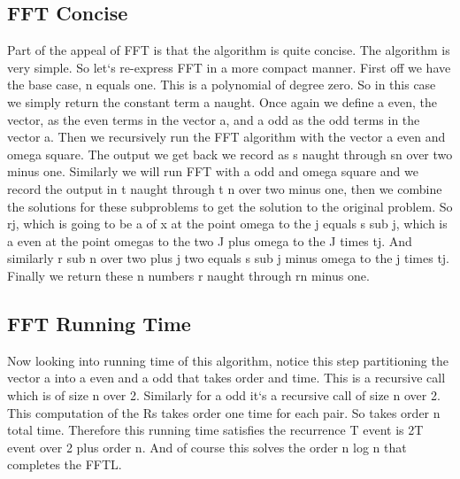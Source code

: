 \subsection{FFT  Concise}
Part of the appeal of FFT is that the algorithm is quite concise.
The algorithm is very simple.
So let`s re-express FFT in a more compact manner.
First off we have the base case, n equals one.
This is a polynomial of degree zero.
So in this case we simply return the constant term a naught.
Once again we define a even, the vector, as the even terms in the vector a, and a odd as the odd terms in the vector a.
Then we recursively run the FFT algorithm with the vector a even and omega square.
The output we get back we record as s naught through sn over two minus one.
Similarly we will run FFT with a odd and omega square and we record the output in t naught through t n over two minus one, then we combine the solutions for these subproblems to get the solution to the original problem.
So rj, which is going to be a of x at the point omega to the j equals s sub j, which is a even at the point omegas to the two J plus omega to the J times tj.
And similarly r sub n over two plus j two equals s sub j minus omega to the j times tj.
Finally we return these n numbers r naught through rn minus one.

\subsection{FFT  Running Time}
Now looking into running time of this algorithm, notice this step partitioning the vector a into a even and a odd that takes order and time.
This is a recursive call which is of size n over 2.
Similarly for a odd it`s a recursive call of size n over 2.
This computation of the Rs takes order one time for each pair.
So takes order n total time.
Therefore this running time satisfies the recurrence T event is 2T event over 2 plus order n.
And of course this solves the order n log n that completes the FFTL\@.

